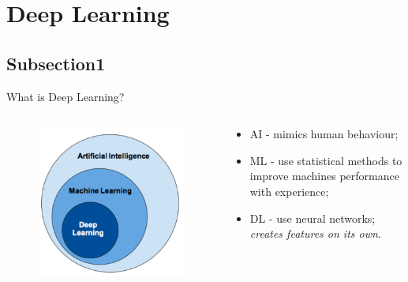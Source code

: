 \documentclass[10pt, xcolor=x11names,compress]{beamer}
\begin{document}
\section{Deep Learning}
\subsection{Subsection1}
\begin{frame}{What is Deep Learning?}
	\begin{columns}
		\begin{column}{0.45\textwidth}
			\begin{figure}
				\centering
				\includegraphics[width=\textwidth]{images/ai_ml_dl.png}
			\end{figure}
		\end{column}
		\begin{column}{0.55\textwidth}
			\begin{itemize}
				\item AI - mimics human behaviour;
				\item ML - use statistical methods to improve machines performance with experience;
				\item DL - use neural networks; \textit{creates features on its own}.
			\end{itemize}
		\end{column}
	\end{columns}
\end{frame}
\end{document}
